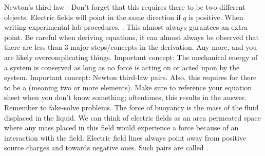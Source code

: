 \markdownRendererInterblockSeparator
{}\markdownRendererUlBeginTight
\markdownRendererUlItem Newton's third law - Don't forget that this requires there to be two different objects.\markdownRendererUlItemEnd 
\markdownRendererUlItem Electric fields will point in the same direction if $q$ is positive.\markdownRendererUlItemEnd 
\markdownRendererUlEndTight \markdownRendererInterblockSeparator
{}\markdownRendererInterblockSeparator
{}\markdownRendererUlBeginTight
\markdownRendererUlItem When writing experimental lab procedures, . This almost always gurantees an extra point.\markdownRendererUlItemEnd 
\markdownRendererUlItem Be careful when deriving equations, it can almost always be observed that there are less than 3 major steps/concepts in the derivation. Any more, and you are likely overcomplicating things.\markdownRendererUlItemEnd 
\markdownRendererUlItem Important concept: The mechanical energy of a system is conserved as long as no force is acting on or acted upon by the system.\markdownRendererUlItemEnd 
\markdownRendererUlItem Important concept: Newton third-law pairs. Also, this requires for there to be a  (meaning two or more elements).\markdownRendererUlItemEnd 
\markdownRendererUlItem Make sure to reference your equation sheet when you don't know something; oftentimes, this results in the answer.\markdownRendererUlItemEnd 
\markdownRendererUlItem Remember to fake-solve problems.\markdownRendererUlItemEnd 
\markdownRendererUlEndTight \markdownRendererInterblockSeparator
{}\markdownRendererInterblockSeparator
{}\markdownRendererUlBeginTight
\markdownRendererUlItem The force of buoyancy is the mass of the fluid displaced in the liquid.\markdownRendererUlItemEnd 
\markdownRendererUlEndTight \markdownRendererInterblockSeparator
{}\markdownRendererInterblockSeparator
{}\markdownRendererUlBegin
\markdownRendererUlItem We can think of electric fields as an area permeated space where any mass placed in this field would experience a force because of an interaction with the field.\markdownRendererUlItemEnd 
\markdownRendererUlItem Electric field lines always point away from positive source charges and towards negative ones. Such pairs are called .\markdownRendererUlItemEnd 
\markdownRendererUlEnd \markdownRendererInterblockSeparator
